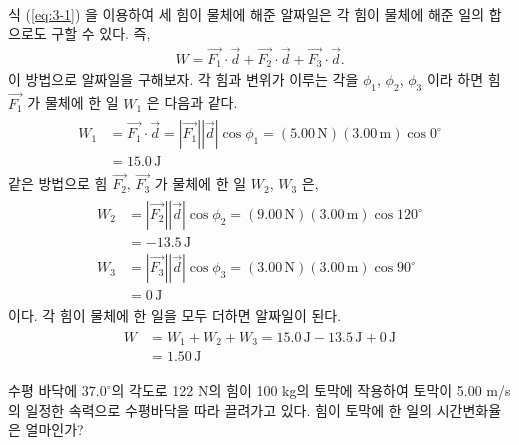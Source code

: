 \documentclass[floatfix,nofootinbib,superscriptaddress,fleqn]{revtex4-2}
\begin{document}
 \\
  식 (\ref{eq:3-1}) 을 이용하여 세 힘이 물체에 해준 알짜일은 각 힘이 물체에 해준 일의 
합으로도 구할 수 있다. 즉,
\begin{align}
  W = \vec{F_1}\cdot\vec{d}+\vec{F_2}\cdot\vec{d}+\vec{F_3}\cdot\vec{d}.
\end{align}
이 방법으로 알짜일을 구해보자. 각 힘과 변위가 이루는 각을 
$\phi_1$, $\phi_2$, $\phi_3$ 이라 하면
 힘 $\vec{F_1}$ 가 물체에 한 일 $W_1$ 은 다음과 같다.
\begin{align}
  \begin{split}
    W_1 &= \vec{F_1}\cdot\vec{d} = |\vec{F_1}||\vec{d}|\cos{\phi_1}
    =(5.00\,\mathrm{N})(3.00\,\mathrm{m})\cos{0^\circ}  \\
    &=15.0\,\mathrm{J}
  \end{split}
\end{align}
같은 방법으로 힘 $\vec{F_2}$, $\vec{F_3}$ 가 물체에 한 일 $W_2$, $W_3$ 은,
\begin{align}
  \begin{split}
    W_2 &= |\vec{F_2}||\vec{d}|\cos{\phi_2}
    =(9.00\,\mathrm{N})(3.00\,\mathrm{m})\cos{120^\circ}  \\
    &=-13.5\,\mathrm{J} \\
    W_3 &= |\vec{F_3}||\vec{d}|\cos{\phi_3}
    =(3.00\,\mathrm{N})(3.00\,\mathrm{m})\cos{90^\circ}  \\
    &=0\,\mathrm{J}
  \end{split}
\end{align}
이다. 각 힘이 물체에 한 일을 모두 더하면 알짜일이 된다.
\begin{align}
  \begin{split}
    W &= W_1+W_2+W_3 = 15.0\,\mathrm{J}-13.5\,\mathrm{J}+0\,\mathrm{J} \\
    &= 1.50\,\mathrm{J}
  \end{split}
  \end{align}

\vspace{1.cm}

수평 바닥에 $37.0^\circ$의 각도로 122 N의 힘이 100 kg의 토막에
작용하여 토막이 5.00 m/s의 일정한 속력으로 수평바닥을 따라 끌려가고
있다. 힘이 토막에 한 일의 시간변화율은 얼마인가?  \\
\end{document}
